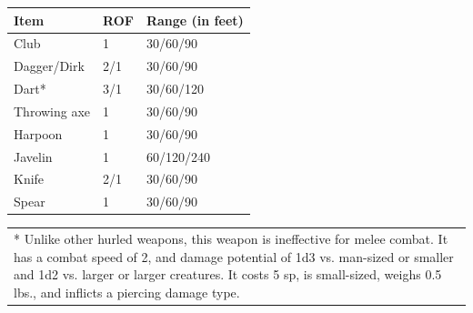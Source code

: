 \noindent
\begin{minipage}{\columnwidth}

\label{hurledweapons}
\noindent
\begin{tabular}{|p{}|p{}|p{}|}
\hline
Item			& ROF	& Range (in feet) \\
\hline\hline
\rowcolor[gray]{.9}Club			& 1		& 30/60/90 \\
Dagger/Dirk		& 2/1	& 30/60/90 \\
\rowcolor[gray]{.9}Dart*			& 3/1	& 30/60/120 \\
Throwing axe	& 1		& 30/60/90 \\
\rowcolor[gray]{.9}Harpoon			& 1		& 30/60/90 \\
Javelin			& 1		& 60/120/240 \\
\rowcolor[gray]{.9}Knife			& 2/1	& 30/60/90 \\
Spear			& 1		& 30/60/90 \\
\hline
\end{tabular}
\noindent\begin{tabular}{p{}}
* Unlike other hurled weapons, this weapon is ineffective for melee combat.  It has a combat speed of 2, and damage potential of 1d3 vs. man-sized or smaller and 1d2 vs. larger or larger creatures.  It costs 5 sp, is small-sized, weighs 0.5 lbs., and inflicts a piercing damage type. \\
\end{tabular}\vspace{.5em}

\end{minipage}

